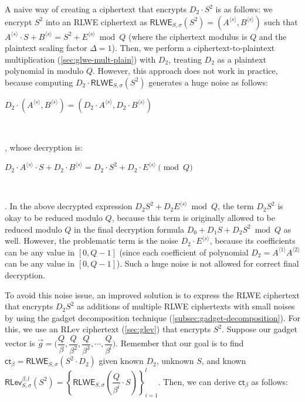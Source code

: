 A naive way of creating a ciphertext that encrypts $D_2 \cdot S^2$ is as follows: we encrypt $S^2$ into an RLWE ciphertext as $\textsf{RLWE}_{S, \sigma}(S^2) = (A^{\langle s \rangle}, B^{\langle s \rangle})$ such that $A^{\langle s \rangle}\cdot S + B^{\langle s \rangle} = S^2 + E^{\langle s \rangle} \bmod Q$ (where the ciphertext modulus is $Q$ and the plaintext scaling factor $\Delta = 1$). Then, we perform a ciphertext-to-plaintext multiplication (\autoref{sec:glwe-mult-plain}) with $D_2$, treating $D_2$ as a plaintext polynomial in modulo $Q$. However, this approach does not work in practice, because computing $D_2 \cdot \textsf{RLWE}_{S, \sigma}(S^2)$ generates a huge noise as follows:

$D_2 \cdot (A^{\langle s \rangle}, B^{\langle s \rangle}) = (D_2\cdot A^{\langle s \rangle}, D_2 \cdot B^{\langle s \rangle})$

$ $

, whose decryption is:

$D_2\cdot A^{\langle s \rangle} \cdot S + D_2\cdot B^{\langle s \rangle} = D_2 \cdot S^2 + D_2\cdot E^{\langle s \rangle} \pmod Q$ 

$ $

. In the above decrypted expression $D_2S^2 + D_2E^{\langle s \rangle} \bmod Q$, the term $D_2S^2$ is okay to be reduced modulo $Q$, because this term is originally allowed to be reduced modulo $Q$ in the final decryption formula $D_0 + D_1S + D_2S^2 \bmod Q$ as well. However, the problematic term is the noise $D_2\cdot E^{\langle s \rangle}$, because its coefficients can be any value in $[0, Q - 1]$ (since each coefficient of polynomial $D_2 = A^{\langle 1 \rangle} A^{\langle 2 \rangle}$ can be any value in $[0, Q - 1]$). Such a huge noise is not allowed for correct final decryption. 

To avoid this noise issue, an improved solution is to express the RLWE ciphertext that encrypts $D_2 S^2$ as additions of multiple RLWE ciphertexts with small noises by using the gadget decomposition technique (\autoref{subsec:gadget-decomposition}). For this, we use an RLev ciphertext (\autoref{sec:glev}) that encrypts $S^2$. Suppose our gadget vector is $\vec{g} = \Bigg(\dfrac{Q}{\beta}, \dfrac{Q}{\beta^2}, \dfrac{Q}{\beta^3}, \cdots, \dfrac{Q}{\beta^l}\Bigg)$. Remember that our goal is to find $\textsf{ct}_\beta = \textsf{RLWE}_{S, \sigma}( S^2 \cdot D_2)$ given known $D_2$, unknown $S$, and known $\textsf{RLev}_{S, \sigma}^{\beta, l}(S^2) = \left\{\textsf{RLWE}_{S, \sigma}\left(\dfrac{Q}{\beta^i}\cdot S\right)\right\}_{i=1}^{l}$. Then, we can derive $\textsf{ct}_\beta$ as follows:

